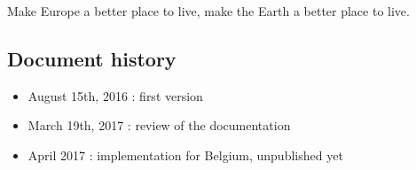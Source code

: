 \documentclass[a4paper, 11pt]{article}
\begin{document}
Make Europe a better place to live, make the Earth a better place to live.
\subsection{Document history}
\begin{itemize}
\item August 15th, 2016 : first version
\item March 19th, 2017 : review of the documentation
\item April 2017 : implementation for Belgium, unpublished yet 

\end{itemize}
\end{document}
